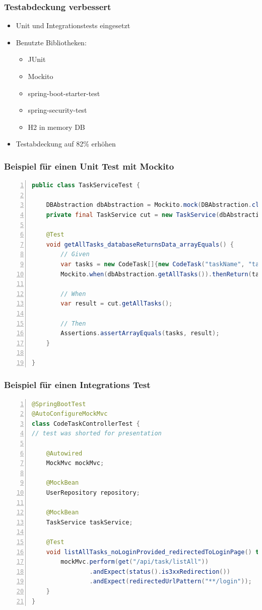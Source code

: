\begin{frame}
\frametitle{Testabdeckung verbessert}
\begin{itemize}
\item Unit und Integrationstests eingesetzt
\item Benutzte Bibliotheken:
\begin{itemize}
\item JUnit
\item Mockito
\item spring-boot-starter-test
\item spring-security-test
\item H2 in memory DB
\end{itemize}
\item Testabdeckung auf 82\% erhöhen
\end{itemize}
\end{frame}

\begin{frame}[containsverbatim]
\frametitle{Beispiel für einen Unit Test mit Mockito}
\begin{shaded}
\begin{lstlisting}[language=Java, basicstyle=\tiny, numbers=left]
public class TaskServiceTest {

    DBAbstraction dbAbstraction = Mockito.mock(DBAbstraction.class);
    private final TaskService cut = new TaskService(dbAbstraction);

    @Test
    void getAllTasks_databaseReturnsData_arrayEquals() {
        // Given
        var tasks = new CodeTask[]{new CodeTask("taskName", "taskDesc", "psvm")};
        Mockito.when(dbAbstraction.getAllTasks()).thenReturn(tasks);

        // When
        var result = cut.getAllTasks();

        // Then
        Assertions.assertArrayEquals(tasks, result);
    }

}
\end{lstlisting}
\end{shaded}
\end{frame}


\begin{frame}[containsverbatim]
\frametitle{Beispiel für einen Integrations Test}
\begin{shaded}
\begin{lstlisting}[language=Java, basicstyle=\tiny, numbers=left]
@SpringBootTest
@AutoConfigureMockMvc
class CodeTaskControllerTest {
// test was shorted for presentation

    @Autowired
    MockMvc mockMvc;

    @MockBean
    UserRepository repository;

    @MockBean
    TaskService taskService;

    @Test
    void listAllTasks_noLoginProvided_redirectedToLoginPage() throws Exception {
        mockMvc.perform(get("/api/task/listAll"))
                .andExpect(status().is3xxRedirection())
                .andExpect(redirectedUrlPattern("**/login"));
    }
}
\end{lstlisting}
\end{shaded}
\end{frame}

